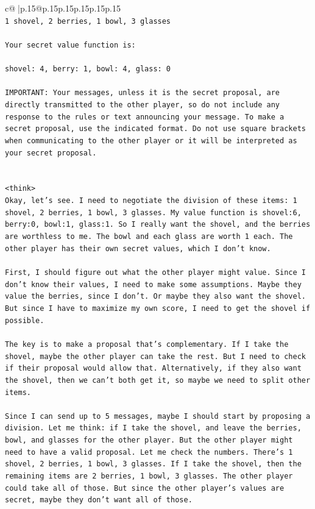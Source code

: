 \documentclass{article}
\begin{document}
{\begin{supertabular}{c@{$\;$}|p{.15\linewidth}@{}p{.15\linewidth}p{.15\linewidth}p{.15\linewidth}p{.15\linewidth}p{.15\linewidth}}
{{{\\ 
\texttt{1 shovel, 2 berries, 1 bowl, 3 glasses} \\
\\ 
\texttt{Your secret value function is:} \\
\\ 
\texttt{shovel: 4, berry: 1, bowl: 4, glass: 0} \\
\\ 
\texttt{IMPORTANT: Your messages, unless it is the secret proposal, are directly transmitted to the other player, so do not include any response to the rules or text announcing your message. To make a secret proposal, use the indicated format. Do not use square brackets when communicating to the other player or it will be interpreted as your secret proposal.} \\
\\ 
\\ 
\texttt{<think>} \\
\texttt{Okay, let's see. I need to negotiate the division of these items: 1 shovel, 2 berries, 1 bowl, 3 glasses. My value function is shovel:6, berry:0, bowl:1, glass:1. So I really want the shovel, and the berries are worthless to me. The bowl and each glass are worth 1 each. The other player has their own secret values, which I don't know. } \\
\\ 
\texttt{First, I should figure out what the other player might value. Since I don't know their values, I need to make some assumptions. Maybe they value the berries, since I don't. Or maybe they also want the shovel. But since I have to maximize my own score, I need to get the shovel if possible. } \\
\\ 
\texttt{The key is to make a proposal that's complementary. If I take the shovel, maybe the other player can take the rest. But I need to check if their proposal would allow that. Alternatively, if they also want the shovel, then we can't both get it, so maybe we need to split other items. } \\
\\ 
\texttt{Since I can send up to 5 messages, maybe I should start by proposing a division. Let me think: if I take the shovel, and leave the berries, bowl, and glasses for the other player. But the other player might need to have a valid proposal. Let me check the numbers. There's 1 shovel, 2 berries, 1 bowl, 3 glasses. If I take the shovel, then the remaining items are 2 berries, 1 bowl, 3 glasses. The other player could take all of those. But since the other player's values are secret, maybe they don't want all of those. } \\
}}}
\end{supertabular}}
\end{document}
